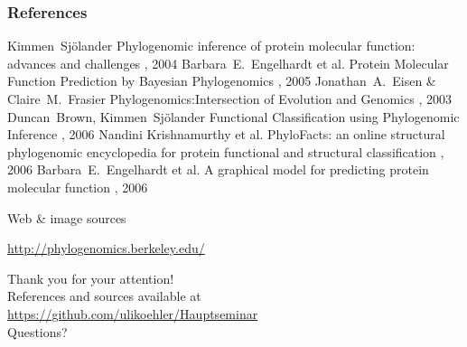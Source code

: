 \documentclass[14pt,xcolor=dvipsnames,pdftex]{beamer}
\begin{document}
\begin{frame}
  \frametitle<presentation>{References}    
  \begin{thebibliography}{10}
  \tiny
  \beamertemplatearticlebibitems
  \bibitem{}
    Kimmen~Sjölander
    \newblock Phylogenomic inference of protein molecular function: advances and challenges
    , 2004
  \bibitem{}
    Barbara~E.~Engelhardt et al.
    \newblock Protein Molecular Function Prediction by Bayesian Phylogenomics
    , 2005
  \bibitem{}
    Jonathan~A.~Eisen \& Claire~M.~Frasier
    \newblock Phylogenomics:Intersection of Evolution and Genomics
    , 2003
  \bibitem{}
    Duncan~Brown, Kimmen~Sjölander
    \newblock Functional Classification using Phylogenomic Inference
    , 2006
  \bibitem{}
    Nandini Krishnamurthy et al.
    \newblock PhyloFacts: an online structural phylogenomic encyclopedia for protein functional and structural classification
    , 2006
  \bibitem{}
    Barbara~E.~Engelhardt et al.
    \newblock A graphical model for predicting protein molecular function
    , 2006
  \end{thebibliography}
\end{frame}


\begin{frame}{Web \& image sources}
 \begin{center}
  \url{http://phylogenomics.berkeley.edu/}
 \end{center}

\end{frame}


\begin{frame}
 \begin{center}
 {\color{BlueViolet}\large Thank you for your attention!}\\[1cm]
 {\small References and sources available at}\\
 {\small \url{https://github.com/ulikoehler/Hauptseminar}}\\[1cm]
 {\color{BlueViolet}\large Questions?}\\[1cm]
 \end{center}
\end{frame}
\end{document}
